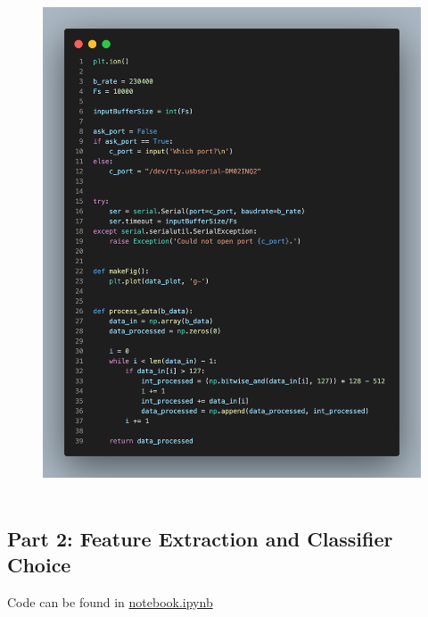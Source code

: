 \documentclass[oneside]{article}
\begin{document}
\begin{figure}[H]
 \centering
  \includegraphics[width = 17cm, height = 15cm]{Pictures/arduino.png}
  \end{figure}
  
  
\newpage
\subsection{Part 2: Feature Extraction and Classifier Choice}

Code can be found in \href{https://github.com/yingzhenwang/Brain/blob/main/notebook.ipynb}{notebook.ipynb}
\end{document}
